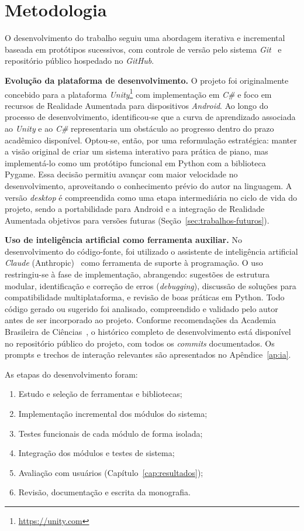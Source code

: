 \documentclass[
  12pt,
  openright,
  twoside,
  a4paper,
  english,
  brazil
]{abntex2}
\begin{document}
\section{Metodologia}

O desenvolvimento do trabalho seguiu uma abordagem iterativa e
incremental baseada em protótipos sucessivos, com controle de versão pelo
sistema \textit{Git}~\cite{git2005} e repositório público hospedado no
\textit{GitHub}.

\textbf{Evolução da plataforma de desenvolvimento.}
O projeto foi originalmente concebido para a plataforma
\textit{Unity}\footnote{\url{https://unity.com}} com implementação em
\textit{C\#} e foco em recursos de Realidade Aumentada para dispositivos
\textit{Android}. Ao longo do processo de desenvolvimento, identificou-se
que a curva de aprendizado associada ao \textit{Unity} e ao \textit{C\#}
representaria um obstáculo ao progresso dentro do prazo acadêmico
disponível. Optou-se, então, por uma reformulação estratégica: manter a
visão original de criar um sistema interativo para prática de piano, mas
implementá-lo como um protótipo funcional em Python com a biblioteca
Pygame. Essa decisão permitiu avançar com maior velocidade no
desenvolvimento, aproveitando o conhecimento prévio do autor na
linguagem. A versão \textit{desktop} é compreendida como uma etapa
intermediária no ciclo de vida do projeto, sendo a portabilidade para
Android e a integração de Realidade Aumentada objetivos para versões
futuras (Seção~\ref{sec:trabalhos-futuros}).

\textbf{Uso de inteligência artificial como ferramenta auxiliar.}
No desenvolvimento do código-fonte, foi utilizado o assistente de
inteligência artificial \textit{Claude} (Anthropic)~\cite{claude2024}
como ferramenta de suporte à programação. O uso restringiu-se à fase de
implementação, abrangendo: sugestões de estrutura modular, identificação
e correção de erros (\textit{debugging}), discussão de soluções para
compatibilidade multiplataforma, e revisão de boas práticas em Python.
Todo código gerado ou sugerido foi analisado, compreendido e validado
pelo autor antes de ser incorporado ao projeto. Conforme recomendações da
Academia Brasileira de Ciências~\cite{abc2023}, o histórico completo de
desenvolvimento está disponível no repositório público do projeto, com
todos os \textit{commits} documentados. Os prompts e trechos de
interação relevantes são apresentados no Apêndice~\ref{ap:ia}.

As etapas do desenvolvimento foram:
\begin{enumerate}
  \item Estudo e seleção de ferramentas e bibliotecas;
  \item Implementação incremental dos módulos do sistema;
  \item Testes funcionais de cada módulo de forma isolada;
  \item Integração dos módulos e testes de sistema;
  \item Avaliação com usuários (Capítulo~\ref{cap:resultados});
  \item Revisão, documentação e escrita da monografia.
\end{enumerate}
\end{document}
